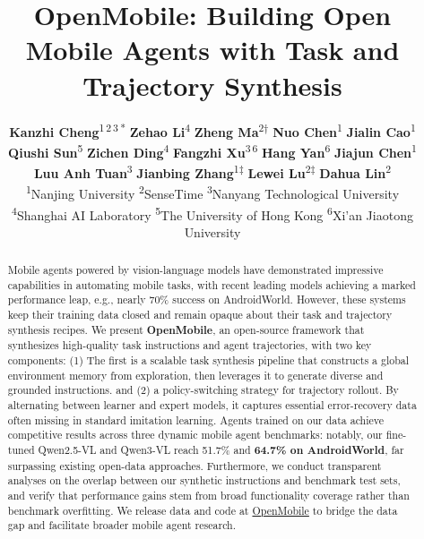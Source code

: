 \documentclass{article} %
\title{OpenMobile: Building Open Mobile Agents with Task and Trajectory Synthesis}
\author{\normalfont\textbf{Kanzhi Cheng}\textsuperscript{1\,2\,3}\,\textsuperscript{*}\qquad
\textbf{Zehao Li}\textsuperscript{4}\qquad
\textbf{Zheng Ma}\textsuperscript{2}\textsuperscript{$\dagger$}\qquad
\textbf{Nuo Chen}\textsuperscript{1}\qquad
\textbf{Jialin Cao}\textsuperscript{1} \\
\textbf{Qiushi Sun}\textsuperscript{5}\qquad
\textbf{Zichen Ding}\textsuperscript{4}\qquad
\textbf{Fangzhi Xu}\textsuperscript{3\,6} \qquad
\textbf{Hang Yan}\textsuperscript{6}\qquad
\textbf{Jiajun Chen}\textsuperscript{1}\\
\textbf{Luu Anh Tuan}\textsuperscript{3}\qquad
\textbf{Jianbing Zhang}\textsuperscript{1}\textsuperscript{$\ddagger$}\qquad
\textbf{Lewei Lu}\textsuperscript{2}\textsuperscript{$\ddagger$}\qquad
\textbf{Dahua Lin}\textsuperscript{2}\\[0.5em]
\textsuperscript{1}Nanjing University\qquad
\textsuperscript{2}SenseTime\qquad
\textsuperscript{3}Nanyang Technological University\\
\textsuperscript{4}Shanghai AI Laboratory
\textsuperscript{5}The University of Hong Kong
\textsuperscript{6}Xi'an Jiaotong University
}
\begin{document}
\ifcolmsubmission
\linenumbers
\fi

\maketitle
\begingroup
\renewcommand\thefootnote{}
\endgroup

\vspace{-0.50cm}
\begin{abstract}
\vspace{-0.20cm}
Mobile agents powered by vision-language models have demonstrated impressive capabilities in automating mobile tasks, with recent leading models achieving a marked performance leap, e.g., nearly 70\% success on AndroidWorld.
However, these systems keep their training data closed and remain opaque about their task and trajectory synthesis recipes.
We present \textbf{OpenMobile}, an open-source framework that synthesizes high-quality task instructions and agent trajectories, with two key components:
(1) The first is a scalable task synthesis pipeline that constructs a global environment memory from exploration, then leverages it to generate diverse and grounded instructions.
and (2) a policy-switching strategy for trajectory rollout. By alternating between learner and expert models, it captures essential error-recovery data often missing in standard imitation learning.
Agents trained on our data achieve competitive results across three dynamic mobile agent benchmarks: notably, our fine-tuned Qwen2.5-VL and Qwen3-VL reach 51.7\% and \textbf{64.7\% on AndroidWorld}, far surpassing existing open-data approaches.
Furthermore, we conduct transparent analyses on the overlap between our synthetic instructions and benchmark test sets, and verify that performance gains stem from broad functionality coverage rather than benchmark overfitting.
We release data and code at \href{https://anonymous.4open.science/r/paper-code-preview-4C99}{OpenMobile} to bridge the data gap and facilitate broader mobile agent research.

\end{abstract}
\end{document}
